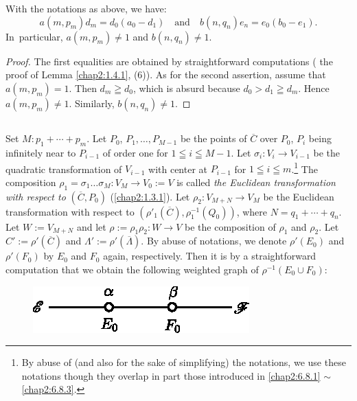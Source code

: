 \begin{lemma*}
With the notations as above, we have:
$$
a(m,p_{m})d_{m}=d_{0}(a_{0}-d_{1})\quad\text{and}\quad
b(n,q_{n})e_{n}=e_{0}(b_{0}-e_{1}). 
$$
In\pageoriginale\ particular, $a(m,p_{m})\neq 1$ and $b(n,q_{n})\neq 1$.
\end{lemma*}

\begin{proof}
The first equalities are obtained by straightforward computations (\cf
the proof of Lemma \ref{chap2:1.4.1}, (6)). As for the second assertion,
assume that $a(m,p_{m})=1$. Then $d_{m}\geqq d_{0}$, which is absurd
because $d_{0}>d_{1}\geqq d_{m}$. Hence $a(m,p_{m})\neq 1$. Similarly,
$b(n,q_{n})\neq 1$.
\end{proof}

\subsection{}\label{chap2:6.10}
Set $M:p_{1}+\cdots+p_{m}$. Let $P_{0}$, $P_{1},\ldots,P_{M-1}$ be the
points of $\overline{C}$ over $P_{0}$, $P_{i}$ being infinitely near
to $P_{i-1}$ of order one for $1\leqq i\leqq M-1$. Let
$\sigma_{i}:V_{i}\to V_{i-1}$ be the quadratic transformation of
$V_{i-1}$ with center at $P_{i-1}$ for $1\leqq i\leqq m$.\footnote{By
  abuse of (and also for the sake of simplifying) the notations, we
  use these notations though they overlap in part those introduced in
  \ref{chap2:6.8.1} $\sim$ \ref{chap2:6.8.3}.} 
The composition $\rho_{1}=\sigma_{1}\ldots\sigma_{M}:V_{M}\to
V_{0}:=V$ is called {\em the Euclidean transformation with respect to}
$(\overline{C},P_{0})$ (\cf \ref{chap2:1.3.1}). Let $\rho_{2}:V_{M+N}\to
V_{M}$ be the Euclidean transformation with respect to
$(\rho'_{1}(\overline{C}),\rho^{-1}_{1}(Q_{0}))$, where
$N=q_{1}+\cdots+q_{n}$. Let $W:=V_{M+N}$ and let
$\rho:=\rho_{1}\rho_{2}:W\to V$ be the composition of $\rho_{1}$ and
$\rho_{2}$. Let $C':=\rho'(\overline{C})$ and
$\Lambda':=\rho'(\overline{\Lambda})$. By abuse of notations, we
denote $\rho'(E_{0})$ and $\rho'(F_{0})$ by $E_{0}$ and $F_{0}$ again,
respectively. Then it is by a straightforward computation that we
obtain the following weighted graph of $\rho^{-1}(E_{0}\cup F_{0})$:
\begin{figure}[H]
\centering
\includegraphics[scale=1.1]{figures/chap2-fig28.eps}
\end{figure}
